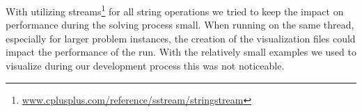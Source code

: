 \documentclass[a4paper, 12pt, bibliography=totoc]{scrartcl}
\begin{document}
With utilizing {streams}\footnote{\url{www.cplusplus.com/reference/sstream/stringstream}} for all string operations we tried to keep the impact on performance during the solving process small. When running on the same thread, especially for larger problem instances, the creation of the visualization files could impact the performance of the run. With the relatively small examples we used to visualize during our development process this was not noticeable.

%
%	
\end{document}

